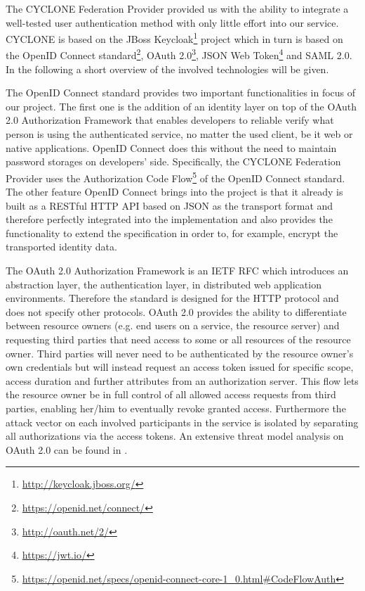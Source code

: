 The CYCLONE Federation Provider provided us with the ability to integrate a well-tested user authentication method with only little effort into our service. CYCLONE is based on the JBoss Keycloak\footnote{\url{http://keycloak.jboss.org/}} project which in turn is based on the OpenID Connect standard\footnote{\url{https://openid.net/connect/}}, OAuth 2.0\footnote{\url{http://oauth.net/2/}}, JSON Web Token\footnote{\url{https://jwt.io/}} and SAML 2.0. In the following a short overview of the involved technologies will be given.

The OpenID Connect standard provides two important functionalities in focus of our project. The first one is the addition of an identity layer on top of the OAuth 2.0 Authorization Framework that enables developers to reliable verify what person is using the authenticated service, no matter the used client, be it web or native applications. OpenID Connect does this without the need to maintain password storages on developers' side. Specifically, the CYCLONE Federation Provider uses the Authorization Code Flow\footnote{\url{https://openid.net/specs/openid-connect-core-1_0.html\#CodeFlowAuth}} of the OpenID Connect standard. The other feature OpenID Connect brings into the project is that it already is built as a RESTful HTTP API based on JSON as the transport format and therefore perfectly integrated into the implementation and also provides the functionality to extend the specification in order to, for example, encrypt the transported identity data.

The OAuth 2.0 Authorization Framework is an IETF RFC \cite{hardt2012oauth} which introduces an abstraction layer, the authentication layer, in distributed web application environments. Therefore the standard is designed for the HTTP protocol and does not specify other protocols. OAuth 2.0 provides the ability to differentiate between resource owners (e.g. end users on a service, the resource server) and requesting third parties that need access to some or all resources of the resource owner. Third parties will never need to be authenticated by the resource owner's own credentials but will instead request an access token issued for specific scope, access duration and further attributes from an authorization server. This flow lets the resource owner be in full control of all allowed access requests from third parties, enabling her/him to eventually revoke granted access. Furthermore the attack vector on each involved participants in the service is isolated by separating all authorizations via the access tokens. An extensive threat model analysis on OAuth 2.0 can be found in \cite{lodderstedt2013oauth}.

